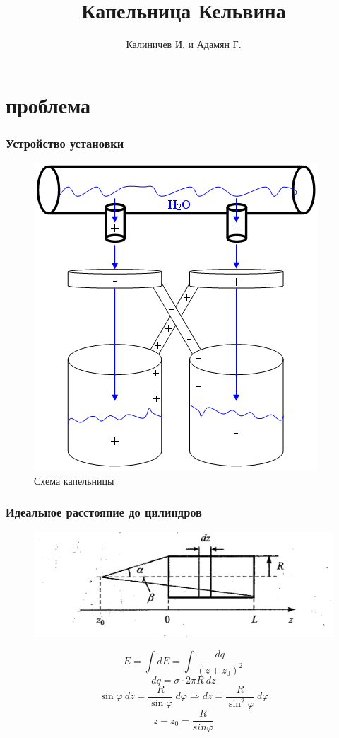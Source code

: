 \documentclass{beamer} %
\title[]{Капельница Кельвина}
\subtitle{}
\author{Калиничев И. и Адамян Г.}
\institute[МФТИ]{МФТИ \newline ФОПФ}
\begin{document}
\frame[plain]{\titlepage}	%

\section{проблема}
\begin{frame}[c]
	\frametitle{Устройство установки}
	\begin{figure}[h]

\centering

\includegraphics[width=0.5\linewidth]{Kelvin_water_dropper.png}

\caption{Схема капельницы}

\label{fig:mpr}

\end{figure}
\end{frame}

\begin{frame}[c]
	\frametitle{Идеальное расстояние до цилиндров}
	\centering
	\begin{figure}[h]

\includegraphics[width=0.8\linewidth]{vpv_cilindr.png}
\label{fig:mpr}

\end{figure}
$$E = \int{dE} = \int{\frac{dq}{(z+z_0)^2}}$$
$$dq = \sigma \cdot  2\pi R \ dz$$
$$\sin \varphi \  dz = \frac{R}{\sin \varphi} \  d\varphi \Rightarrow dz = \frac{R}{\sin^2\varphi} \ d\varphi$$
$$z-z_0 = \frac{R}{sin\varphi}$$
\end{frame}
\end{document}
